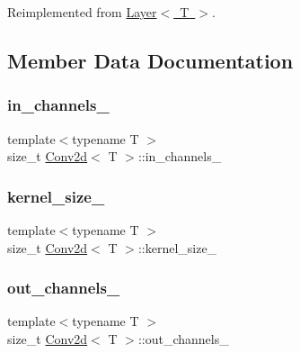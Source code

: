 Reimplemented from \mbox{\hyperlink{class_layer_a43681206a2ef690667c41423b6b6f20b}{Layer$<$ T $>$}}.



\subsection{Member Data Documentation}
\mbox{\label{class_conv2d_afdb638e506f642d24a8d22fb8c2a821a}} 
\subsubsection{\texorpdfstring{in\_channels\_}{in\_channels\_}}
{\footnotesize\ttfamily template$<$typename T $>$ \\
size\+\_\+t \mbox{\hyperlink{class_conv2d}{Conv2d}}$<$ T $>$\+::in\+\_\+channels\+\_\+\hspace{0.3cm}{\ttfamily [protected]}}

\mbox{\label{class_conv2d_ad6447ab4000d593e8c4be9bb9c18f92b}} 
\subsubsection{\texorpdfstring{kernel\_size\_}{kernel\_size\_}}
{\footnotesize\ttfamily template$<$typename T $>$ \\
size\+\_\+t \mbox{\hyperlink{class_conv2d}{Conv2d}}$<$ T $>$\+::kernel\+\_\+size\+\_\+\hspace{0.3cm}{\ttfamily [protected]}}

\mbox{\label{class_conv2d_a48b99a4dee42c4d4221eddedccceffba}} 
\subsubsection{\texorpdfstring{out\_channels\_}{out\_channels\_}}
{\footnotesize\ttfamily template$<$typename T $>$ \\
size\+\_\+t \mbox{\hyperlink{class_conv2d}{Conv2d}}$<$ T $>$\+::out\+\_\+channels\+\_\+\hspace{0.3cm}{\ttfamily [protected]}}

